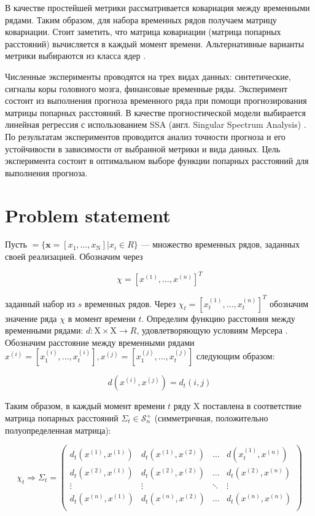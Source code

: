 \documentclass{article}
\begin{document}
В качестве простейшей метрики рассматривается ковариация между временными рядами. \cite{Boyd} Таким образом, для набора временных рядов получаем матрицу ковариации. Стоит заметить, что матрица ковариации (матрица попарных расстояний) вычисляется в каждый момент времени. Альтернативные варианты метрики выбираются из класса ядер \cite{shawe2004kernel}.

Численные эксперименты проводятся на трех видах данных: синтетические, сигналы коры головного мозга, финансовые временные ряды. Эксперимент состоит из выполнения прогноза временного ряда при помощи прогнозирования матрицы попарных расстояний. В качестве прогностической модели выбирается линейная регрессия с использованием SSA (англ. Singular Spectrum Analysis) \cite{vautard1992singular}. По результатам экспериментов проводится анализ точности прогноза и его устойчивости в зависимости от выбранной метрики и вида данных. Цель эксперимента состоит в оптимальном выборе функции попарных расстояний для выполнения прогноза.

\section{Problem statement}

Пусть  $ = \{\mathbf{x} = [x_1, \ldots, x_\text{N}] | x_i \in R\}$ --- множество временных рядов, заданных своей реализацией. Обозначим через 

\begin{equation}
    \chi = [x^{(1)}, \ldots, x^{(n)}]^T
\end{equation}

заданный набор из $s$ временных рядов. Через $\chi_t = [x_t^{(1)}, \ldots, x_t^{(n)}]^T$
обозначим значение ряда $\chi$ в момент времени $t$. Определим функцию расстояния между временными рядами: $d : \text{X} \times \text{X} \rightarrow R$, удовлетворяющую условиям Мерсера \cite{ghojogh2021reproducing}. Обозначим расстояние между временными рядами $x^{(i)} = [x_1^{(i)}, \ldots, x_t^{(i)}], x^{(j)} = [x^{(j)}_1, \ldots, x^{(j)}_t]$ следующим образом:

\begin{equation}
    d(x^{(i)}, x^{(j)}) = d_t(i, j)
\end{equation}

Таким образом, в каждый момент времени $t$ ряду $\text{X}$ поставлена в соответствие матрица попарных расстояний $\Sigma_t \in \mathcal{S}_n^+$ (симметричная, положительно полуопределенная матрица):

\begin{equation}
    \chi_t \Rightarrow \Sigma_t = \left(
\begin{array}{cccc}
d_t(x^{(1)}, x^{(1)}) & d_t(x^{(1)}, x^{(2)}) & \ldots & d(x_t^{(1)}, x^{(n)})\\
d_t(x^{(2)}, x^{(1)}) & d_t(x^{(2)}, x^{(2)}) & \ldots & d_t(x^{(2)}, x^{(n)})\\
\vdots & \vdots & \ddots & \vdots\\
d_t(x^{(n)}, x^{(1)}) & d_t(x^{(n)}, x^{(2)}) & \ldots & d_t(x^{(n)}, x^{(n)})\\
\end{array}
\right)
\end{equation}
\end{document}
